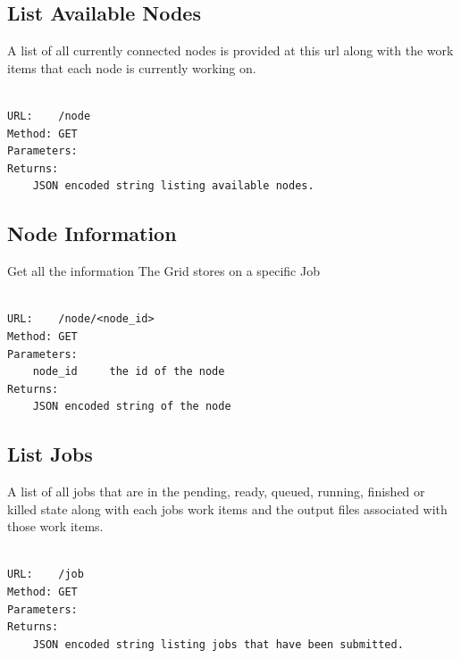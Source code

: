 \subsection{List Available Nodes}
\label{listavailablenodes}

A list of all currently connected nodes is provided at this url along with the work items that each node is currently working on.

\begin{adjustwidth}{2.5em}{2.5em}
\begin{verbatim}

URL:    /node
Method: GET
Parameters:
Returns:    
    JSON encoded string listing available nodes.

\end{verbatim}
\end{adjustwidth}

\subsection{Node Information}
\label{nodeinformation}

Get all the information The Grid stores on a specific Job

\begin{adjustwidth}{2.5em}{2.5em}
\begin{verbatim}

URL:    /node/<node_id>
Method: GET
Parameters:
    node_id     the id of the node
Returns:    
    JSON encoded string of the node

\end{verbatim}
\end{adjustwidth}

\subsection{List Jobs}
\label{listjobs}

A list of all jobs that are in the pending, ready, queued, running, finished or killed state along with each jobs work items and the output files associated with those work items.

\begin{adjustwidth}{2.5em}{2.5em}
\begin{verbatim}

URL:    /job
Method: GET
Parameters:
Returns:    
    JSON encoded string listing jobs that have been submitted.

\end{verbatim}
\end{adjustwidth}

